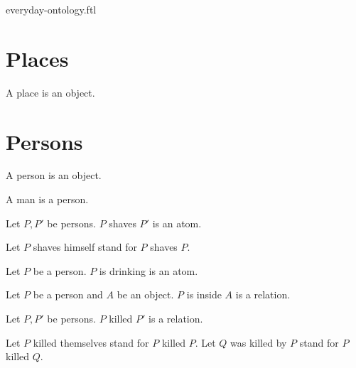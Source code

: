 \documentclass{stex}
\begin{document}
\begin{smodule}{everyday-ontology.ftl}

  \section*{Places}

  \begin{forthel}
    \begin{signature*}
      A place is an object.
    \end{signature*}
  \end{forthel}


  \section*{Persons}

  \begin{forthel}
    \begin{signature*}
      A person is an object.
    \end{signature*}

    \begin{signature*}
      A man is a person.
    \end{signature*}

    \begin{signature*}
      Let $P, P'$ be persons.
      $P$ shaves $P'$ is an atom.
    \end{signature*}

    Let $P$ shaves himself stand for $P$ shaves $P$.

    \begin{signature*}
      Let $P$ be a person.
      $P$ is drinking is an atom.
    \end{signature*}

    \begin{signature*}
      Let $P$ be a person and $A$ be an object.
      $P$ is inside $A$ is a relation.
    \end{signature*}

    \begin{signature*}
      Let $P, P'$ be persons.
      $P$ killed $P'$ is a relation.
    \end{signature*}

    Let $P$ killed themselves stand for $P$ killed $P$.
    Let $Q$ was killed by $P$ stand for $P$ killed $Q$.


\end{forthel}
\end{smodule}
\end{document}
